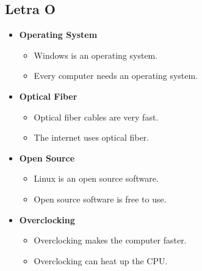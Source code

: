     \subsection{Letra O}
    \begin{itemize}
        \item \textbf{Operating System}
        \begin{itemize}
            \item Windows is an operating system.
            \item Every computer needs an operating system.
        \end{itemize}
        \item \textbf{Optical Fiber}
        \begin{itemize}
            \item Optical fiber cables are very fast.
            \item The internet uses optical fiber.
        \end{itemize}
        \item \textbf{Open Source}
        \begin{itemize}
            \item Linux is an open source software.
            \item Open source software is free to use.
        \end{itemize}
        \item \textbf{Overclocking}
        \begin{itemize}
            \item Overclocking makes the computer faster.
            \item Overclocking can heat up the CPU.
        \end{itemize}
    \end{itemize}
